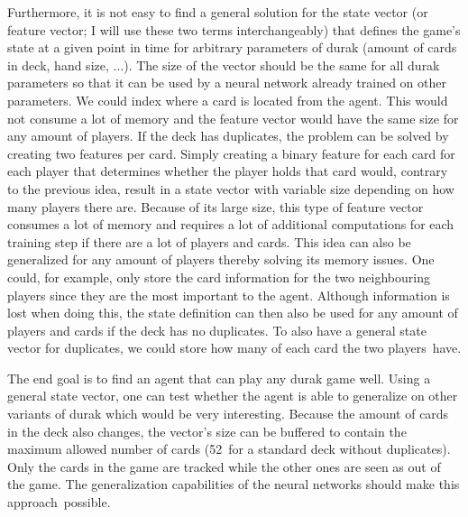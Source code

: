 \documentclass[a4paper,titlepage]{article}
\begin{document}
Furthermore, it is not easy to find a general solution for the state vector (or feature vector; I will use these two terms interchangeably) that defines the game's state at a given point in time for arbitrary parameters of durak (amount of cards in deck, hand size, ...). The size of the vector should be the same for all durak parameters so that it can be used by a neural network already trained on other parameters.
We could index where a card is located from the agent. This would not consume a lot of memory and the feature vector would have the same size for any amount of players. If the deck has duplicates, the problem can be solved by creating two features per card.
Simply creating a binary feature for each card for each player that determines whether the player holds that card would, contrary to the previous idea, result in a state vector with variable size depending on how many players there are. Because of its large size, this type of feature vector consumes a lot of memory and requires a lot of additional computations for each training step if there are a lot of players and cards.
This idea can also be generalized for any amount of players thereby solving its memory issues. One could, for example, only store the card information for the two neighbouring players since they are the most important to the agent. Although information is lost when doing this, the state definition can then also be used for any amount of players and cards if the deck has no duplicates. To also have a general state vector for duplicates, we could store how many of each card the two players~have.

The end goal is to find an agent that can play any durak game well. Using a general state vector, one can test whether the agent is able to generalize on other variants of durak which would be very interesting. 
Because the amount of cards in the deck also changes, the vector's size can be buffered to contain the maximum allowed number of cards (52~for a standard deck without duplicates). Only the cards in the game are tracked while the other ones are seen as out of the game. The generalization capabilities of the neural networks should make this approach~possible.
\end{document}
